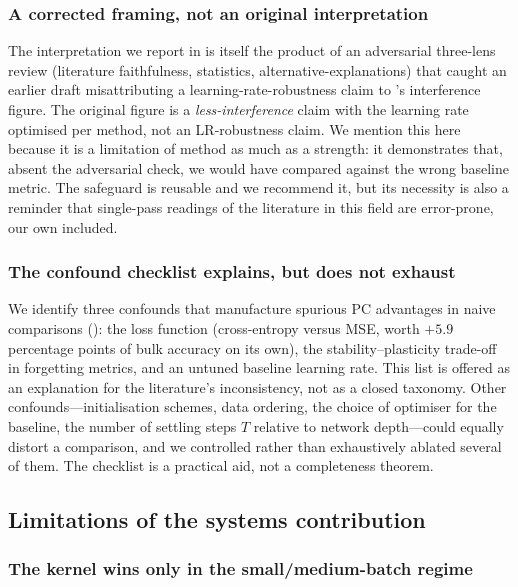 \subsubsection{A corrected framing, not an original interpretation}

The interpretation we report in  is itself the product of an
adversarial three-lens review (literature faithfulness, statistics,
alternative-explanations) that caught an earlier draft misattributing a
learning-rate-robustness claim to \citet{song2024prospective}'s interference figure.
The original figure is a \emph{less-interference} claim with the learning rate
optimised per method, not an LR-robustness claim. We mention this here because it is
a limitation of method as much as a strength: it demonstrates that, absent the
adversarial check, we would have compared against the wrong baseline metric. The
safeguard is reusable and we recommend it, but its necessity is also a reminder that
single-pass readings of the literature in this field are error-prone, our own
included.

\subsubsection{The confound checklist explains, but does not exhaust}

We identify three confounds that manufacture spurious PC advantages in naive
comparisons (): the loss function (cross-entropy versus MSE, worth
$+5.9$ percentage points of bulk accuracy on its own), the
stability--plasticity trade-off in forgetting metrics, and an untuned baseline
learning rate. This list is offered as an explanation for the literature's
inconsistency, not as a closed taxonomy. Other confounds---initialisation schemes,
data ordering, the choice of optimiser for the baseline, the number of settling
steps $T$ relative to network depth---could equally distort a comparison, and we
controlled rather than exhaustively ablated several of them. The checklist is a
practical aid, not a completeness theorem.

\subsection{Limitations of the systems contribution}

\subsubsection{The kernel wins only in the small/medium-batch regime}

